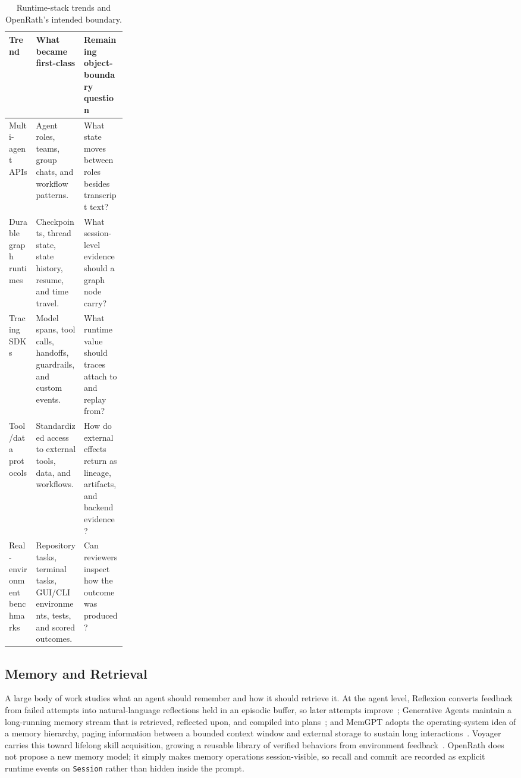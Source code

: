 \documentclass{llmxive}
\begin{document}
\begin{table}[!htbp]
\vspace{0.2em}
\centering
\begin{tabularx}{\linewidth}{@{}>{\arraybackslash}p{0.23\linewidth}>{\arraybackslash}X>{\arraybackslash}X@{}}
\toprule
Trend & What became first-class & Remaining object-boundary question \\
\midrule
Multi-agent APIs & Agent roles, teams, group chats, and workflow patterns. & What state moves between roles besides transcript text? \\
Durable graph runtimes & Checkpoints, thread state, state history, resume, and time travel. & What session-level evidence should a graph node carry? \\
Tracing SDKs & Model spans, tool calls, handoffs, guardrails, and custom events. & What runtime value should traces attach to and replay from? \\
Tool/data protocols & Standardized access to external tools, data, and workflows. & How do external effects return as lineage, artifacts, and backend evidence? \\
Real-environment benchmarks & Repository tasks, terminal tasks, GUI/CLI environments, tests, and scored outcomes. & Can reviewers inspect how the outcome was produced? \\
\bottomrule
\end{tabularx}
\vspace{0.2em}
\caption{Runtime-stack trends and OpenRath's intended boundary.}
\label{tab:related-runtime-landscape}
\end{table}

\subsection{Memory and Retrieval}

A large body of work studies what an agent should remember and how it should
retrieve it. At the agent level, Reflexion converts feedback from failed
attempts into natural-language reflections held in an episodic buffer, so later
attempts improve~\cite{reflexion}; Generative Agents maintain a long-running
memory stream that is retrieved, reflected upon, and compiled into
plans~\cite{generative-agents}; and MemGPT adopts the operating-system idea of a
memory hierarchy, paging information between a bounded context window and
external storage to sustain long interactions~\cite{memgpt}. Voyager carries
this toward lifelong skill acquisition, growing a reusable library of verified
behaviors from environment feedback~\cite{voyager}. OpenRath does not propose a new memory model; it simply makes memory operations session-visible, so recall and commit are recorded as explicit runtime events on \texttt{Session} rather than hidden inside the prompt.
\end{document}
